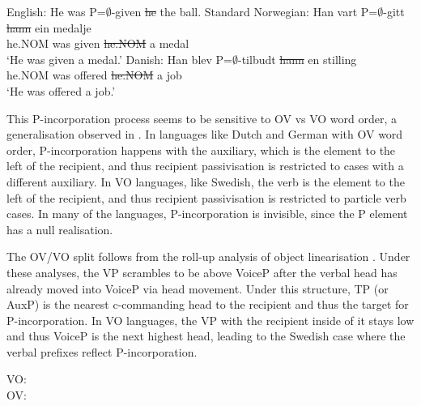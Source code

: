 \begin{exe}
	\ex English: He was P=$\emptyset$-given \sout{he} the ball.\label{ex:eng-null-incorp}
	\ex Standard Norwegian:\label{ex:nor-null-incorp}
	\gll Han vart P=$\emptyset$-gitt \sout{hann} ein medalje\\
	he.NOM was given \sout{he.NOM} a medal\\
	\trans `He was given a medal.'
	\ex Danish:\label{ex:dan-null-incorp}
	\gll Han blev P=$\emptyset$-tilbudt \sout{hann} en stilling\\
	he.NOM was offered \sout{he.NOM} a job\\
	\trans `He was offered a job.'
\end{exe}

This P-incorporation process seems to be sensitive to OV vs VO word order, a generalisation observed in \cite{Sprouse.1995}. In languages like Dutch and German with OV word order, P-incorporation happens with the auxiliary, which is the element to the left of the recipient, and thus recipient passivisation is restricted to cases with a different auxiliary. In VO languages, like Swedish, the verb is the element to the left of the recipient, and thus recipient passivisation is restricted to particle verb cases. In many of the languages, P-incorporation is invisible, since the P element has a null realisation.

The OV/VO split follows from the roll-up analysis of object linearisation \citep{Biberauer.2004,Biberauer.2005,Wallenberg.2009}. Under these analyses, the VP scrambles to be above VoiceP after the verbal head has already moved into VoiceP via head movement. Under this structure, TP (or AuxP) is the nearest c-commanding head to the recipient and thus the target for P-incorporation. In VO languages, the VP with the recipient inside of it stays low and thus VoiceP is the next highest head, leading to the Swedish case where the verbal prefixes reflect P-incorporation.

\begin{exe}
	 VO:\\
	\ex OV:\\

\end{exe}


